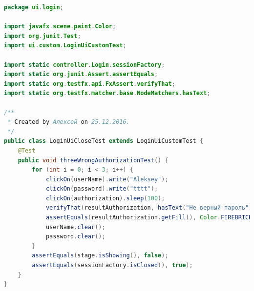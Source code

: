 \documentclass[a4paper,12pt]{article}
\begin{document}
\newpage
\begin{lstlisting}[language=java, caption=код модуля LoginUiCloseTest.java]
package ui.login;

import javafx.scene.paint.Color;
import org.junit.Test;
import ui.custom.LoginUiCustomTest;

import static controller.Login.sessionFactory;
import static org.junit.Assert.assertEquals;
import static org.testfx.api.FxAssert.verifyThat;
import static org.testfx.matcher.base.NodeMatchers.hasText;

/**
 * Created by Алексей on 25.12.2016.
 */
public class LoginUiCloseTest extends LoginUiCustomTest {
    @Test
    public void threeWrongAuthorizationTest() {
        for (int i = 0; i < 3; i++) {
            clickOn(userName).write("Aleksey");
            clickOn(password).write("tttt");
            clickOn(authorization).sleep(100);
            verifyThat(resultAuthorization, hasText("Не верный пароль"));
            assertEquals(resultAuthorization.getFill(), Color.FIREBRICK);
            userName.clear();
            password.clear();
        }
        assertEquals(stage.isShowing(), false);
        assertEquals(sessionFactory.isClosed(), true);
    }
}
\end{lstlisting}
\end{document}
